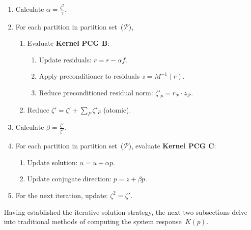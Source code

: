 \documentclass[]             %
{NASA}                       %
\begin{document}
\begin{algorithm}[ht]
\begin{enumerate}
\begin{enumerate}
\begin{enumerate}
\item Reduce $\gamma=\gamma+\sum_{P}\gamma_{P}$ (atomic).
\end{enumerate}
\item Calculate $\alpha=\frac{\zeta^{2}}{\gamma}$.
\item For each partition in partition set~($\mathcal{P}$),
\begin{enumerate}
\item Evaluate \textbf{Kernel PCG B}:
\begin{enumerate}
\item Update residuals: ${r}={r}-\alpha{f}$.
\item Apply preconditioner to residuals ${z}=M^{-1}({r})$.
\item Reduce preconditioned residual norm: $\zeta'_{p}={r}_{\mathcal{P}}\cdot{z}_{\mathcal{P}}$.%
\end{enumerate}
\item Reduce $\zeta'=\zeta'+\sum_{P}\zeta'_{P}$ (atomic).%
\end{enumerate}
\item Calculate $\beta=\frac{\zeta'}{\zeta^{2}}$.
\item For each partition in partition set~($\mathcal{P}$), evaluate \textbf{Kernel PCG C}:
\begin{enumerate}
\item Update solution: ${u}={u}+\alpha{p}$.
\item Update conjugate direction: ${p}={z}+\beta{p}$.
\end{enumerate}
\item For the next iteration, update: $\zeta^{2}=\zeta'$.
\end{enumerate}
\end{enumerate}
\end{algorithm}


Having established the iterative solution strategy, the next two subsections delve into traditional methods of computing the system response~$K(p)$.
\end{document}
